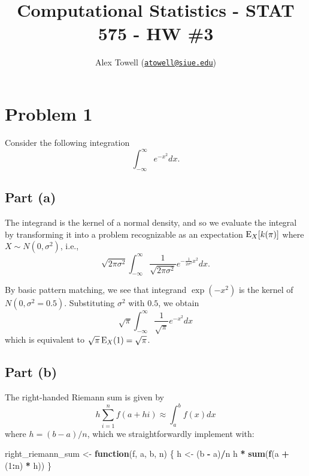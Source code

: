 \documentclass[
  12pt,
]{paper}
\title{Computational Statistics - STAT 575 - HW \#3}
\author{Alex Towell
(\href{mailto:atowell@siue.edu}{\nolinkurl{atowell@siue.edu}})}
\date{}
\newenvironment{Shaded}{\begin{snugshade}}{\end{snugshade}}
\newcommand{\ControlFlowTok}[1]{\textcolor[rgb]{0.13,0.29,0.53}{\textbf{#1}}}
\newcommand{\DecValTok}[1]{\textcolor[rgb]{0.00,0.00,0.81}{#1}}
\newcommand{\FunctionTok}[1]{\textcolor[rgb]{0.13,0.29,0.53}{\textbf{#1}}}
\newcommand{\NormalTok}[1]{#1}
\newcommand{\OtherTok}[1]{\textcolor[rgb]{0.56,0.35,0.01}{#1}}
\newcommand{\SpecialCharTok}[1]{\textcolor[rgb]{0.81,0.36,0.00}{\textbf{#1}}}
\begin{document}
\maketitle

\hypertarget{problem-1}{%
\section{Problem 1}\label{problem-1}}

Consider the following integration \[
  \int_{-\infty}^{\infty} e^{-x^2} dx.
\]

\hypertarget{part-a}{%
\subsection{Part (a)}\label{part-a}}


The integrand is the kernel of a normal density, and so we evaluate the
integral by transforming it into a problem recognizable as an
expectation \(\operatorname{E}_X\!\left[k(\pi)\right]\) where
\(X \sim N(0,\sigma^2)\), i.e., \[
  \sqrt{2 \pi \sigma^2} \int_{-\infty}^{\infty} \frac{1}{\sqrt{2 \pi \sigma^2}} e^{-\frac{1}{2 \sigma^2}x^2} dx.
\]

By basic pattern matching, we see that integrand \(\exp(-x^2)\) is the
kernel of \(N(0, \sigma^2 = 0.5)\). Substituting \(\sigma^2\) with
\(0.5\), we obtain \[
  \sqrt{\pi} \int_{-\infty}^{\infty} \frac{1}{\sqrt{\pi}} e^{-x^2} dx
\] which is equivalent to \(\sqrt{\pi} \operatorname{E}_X(1) = \sqrt{\pi}\).

\hypertarget{part-b}{%
\subsection{Part (b)}\label{part-b}}


The right-handed Riemann sum is given by \[
  h \sum_{i=1}^{n} f(a + h i) \approx \int_{a}^{b} f(x) dx
\] where \(h = (b-a)/n\), which we straightforwardly implement with:

\begin{Shaded}
\begin{Highlighting}[]
\NormalTok{right\_riemann\_sum }\OtherTok{\textless{}{-}} \ControlFlowTok{function}\NormalTok{(f, a, b, n) \{}
\NormalTok{    h }\OtherTok{\textless{}{-}}\NormalTok{ (b }\SpecialCharTok{{-}}\NormalTok{ a)}\SpecialCharTok{/}\NormalTok{n}
\NormalTok{    h }\SpecialCharTok{*} \FunctionTok{sum}\NormalTok{(}\FunctionTok{f}\NormalTok{(a }\SpecialCharTok{+}\NormalTok{ (}\DecValTok{1}\SpecialCharTok{:}\NormalTok{n) }\SpecialCharTok{*}\NormalTok{ h))}
\NormalTok{\}}
\end{Highlighting}
\end{Shaded}
\end{document}
